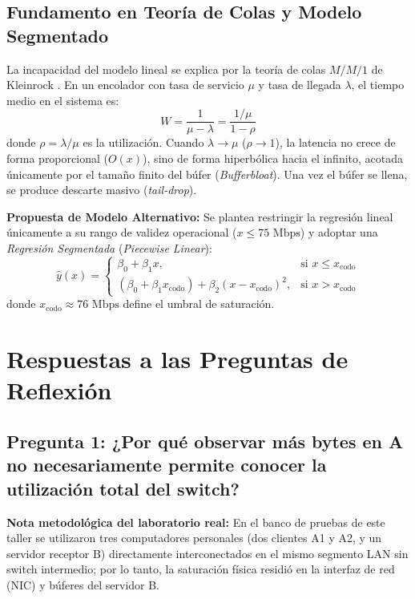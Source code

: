 \documentclass[10pt,twocolumn,letterpaper]{article}
\begin{document}
\subsection{Fundamento en Teoría de Colas y Modelo Segmentado}
La incapacidad del modelo lineal se explica por la teoría de colas $M/M/1$ de Kleinrock \cite{kurose2021computer}. En un encolador con tasa de servicio $\mu$ y tasa de llegada $\lambda$, el tiempo medio en el sistema es:
\begin{equation}
    W = \frac{1}{\mu - \lambda} = \frac{1/\mu}{1 - \rho}
\end{equation}
donde $\rho = \lambda / \mu$ es la utilización. Cuando $\lambda \to \mu$ ($\rho \to 1$), la latencia no crece de forma proporcional ($O(x)$), sino de forma hiperbólica hacia el infinito, acotada únicamente por el tamaño finito del búfer (\textit{Bufferbloat}). Una vez el búfer se llena, se produce descarte masivo (\textit{tail-drop}).

\textbf{Propuesta de Modelo Alternativo:} Se plantea restringir la regresión lineal únicamente a su rango de validez operacional ($x \le 75\text{ Mbps}$) y adoptar una \textit{Regresión Segmentada} (\textit{Piecewise Linear}):
\begin{equation}
    \hat{y}(x) = \begin{cases}
        \beta_0 + \beta_1 x, & \text{si } x \le x_{\text{codo}} \\
        (\beta_0 + \beta_1 x_{\text{codo}}) + \beta_2 (x - x_{\text{codo}})^2, & \text{si } x > x_{\text{codo}}
    \end{cases}
\end{equation}
donde $x_{\text{codo}} \approx 76\text{ Mbps}$ define el umbral de saturación.

\section{Respuestas a las Preguntas de Reflexión}

\subsection{Pregunta 1: ¿Por qué observar más bytes en A no necesariamente permite conocer la utilización total del switch?}
\noindent \textbf{Nota metodológica del laboratorio real:} En el banco de pruebas de este taller se utilizaron tres computadores personales (dos clientes A1 y A2, y un servidor receptor B) directamente interconectados en el mismo segmento LAN sin switch intermedio; por lo tanto, la saturación física residió en la interfaz de red (NIC) y búferes del servidor B.
\end{document}
